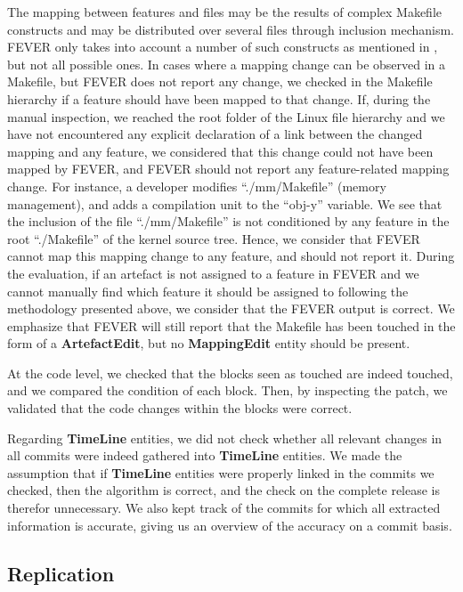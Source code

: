 The mapping between features and files may be the results of complex Makefile constructs and may 
be distributed over several files through inclusion mechanism.
FEVER only takes into account a number of such constructs as mentioned in , but not all possible ones.
In cases where a mapping change can be observed in a Makefile, but FEVER does not report
any change, we checked in the Makefile hierarchy if a feature should have been mapped to that change.
If, during the manual inspection, we reached the root folder of the Linux file hierarchy and
we have not encountered any explicit declaration of a link between the changed mapping and any feature, 
we considered that this change could not have been mapped by FEVER, and FEVER should not report any feature-related mapping change.
For instance, a developer modifies ``./mm/Makefile'' (memory management), and adds a compilation unit to the ``obj-y'' variable.
We see that the inclusion of the file ``./mm/Makefile'' is not conditioned by any feature in the root ``./Makefile'' of the kernel source tree.
Hence, we consider that FEVER cannot map this mapping change to any feature, and should not report it.
During the evaluation, if an artefact is not assigned to a feature in FEVER and we cannot manually find
which feature it should be assigned to following the methodology presented above, we consider that the FEVER output is correct.
We emphasize that FEVER will still report that the Makefile has been touched in the form of a \textbf{ArtefactEdit},
but no \textbf{MappingEdit} entity should be present.

At the code level, we checked that the blocks seen as touched are indeed touched, and we compared the condition of each block.
Then, by inspecting the patch, we validated that the code changes within the blocks were correct.

Regarding \textbf{TimeLine} entities, we did not check whether all relevant changes in all commits were indeed gathered into \textbf{TimeLine} entities.
We made the assumption that if \textbf{TimeLine} entities were properly linked in the commits we checked, then
the algorithm is correct, and the check on the complete release is therefor unnecessary.
We also kept track of the commits for which all extracted information is accurate, giving us an overview of the accuracy on a commit basis.



\subsection{Replication}

